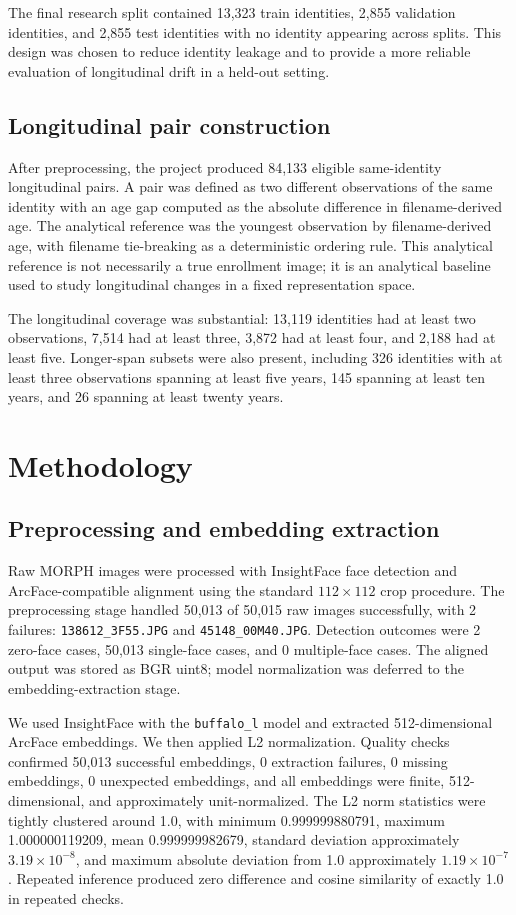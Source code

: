 \documentclass[conference]{IEEEtran}
\begin{document}
The final research split contained 13,323 train identities, 2,855 validation identities, and 2,855 test identities with no identity appearing across splits. This design was chosen to reduce identity leakage and to provide a more reliable evaluation of longitudinal drift in a held-out setting.

\subsection{Longitudinal pair construction}
After preprocessing, the project produced 84,133 eligible same-identity longitudinal pairs. A pair was defined as two different observations of the same identity with an age gap computed as the absolute difference in filename-derived age. The analytical reference was the youngest observation by filename-derived age, with filename tie-breaking as a deterministic ordering rule. This analytical reference is not necessarily a true enrollment image; it is an analytical baseline used to study longitudinal changes in a fixed representation space.

The longitudinal coverage was substantial: 13,119 identities had at least two observations, 7,514 had at least three, 3,872 had at least four, and 2,188 had at least five. Longer-span subsets were also present, including 326 identities with at least three observations spanning at least five years, 145 spanning at least ten years, and 26 spanning at least twenty years.

\section{Methodology}
\label{sec:methodology}
\subsection{Preprocessing and embedding extraction}
Raw MORPH images were processed with InsightFace face detection and ArcFace-compatible alignment using the standard $112 \times 112$ crop procedure. The preprocessing stage handled 50,013 of 50,015 raw images successfully, with 2 failures: \texttt{138612\_3F55.JPG} and \texttt{45148\_00M40.JPG}. Detection outcomes were 2 zero-face cases, 50,013 single-face cases, and 0 multiple-face cases. The aligned output was stored as BGR uint8; model normalization was deferred to the embedding-extraction stage.

We used InsightFace with the \texttt{buffalo\_l} model and extracted 512-dimensional ArcFace embeddings. We then applied L2 normalization. Quality checks confirmed 50,013 successful embeddings, 0 extraction failures, 0 missing embeddings, 0 unexpected embeddings, and all embeddings were finite, 512-dimensional, and approximately unit-normalized. The L2 norm statistics were tightly clustered around 1.0, with minimum 0.999999880791, maximum 1.000000119209, mean 0.999999982679, standard deviation approximately $3.19 \times 10^{-8}$, and maximum absolute deviation from 1.0 approximately $1.19 \times 10^{-7}$. Repeated inference produced zero difference and cosine similarity of exactly 1.0 in repeated checks.
\end{document}
